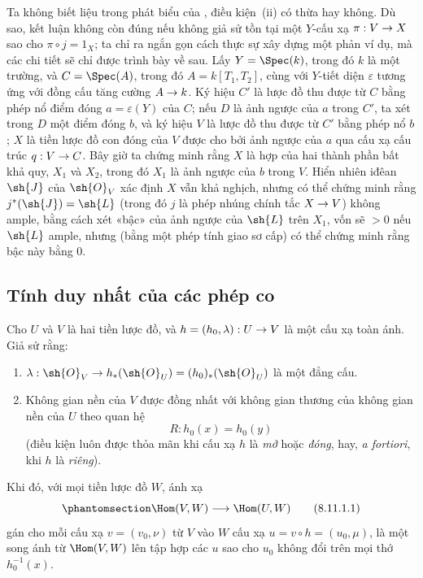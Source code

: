\documentclass[oneside,10pt]{amsart}
\makeatletter
\newcommand{\ega@arrow}[2]{\mathchoice{#1}{#2}{#2}{#2}}
\renewcommand{\to}{\ega@arrow{\longrightarrow}{\rightarrow}}
\newcommand{\oldpage}[2][]{\marginnote{\normalfont\footnotesize\textbf{#1}~|~#2}\ignorespaces}
\let\EGAOriginalLabel\label
\renewcommand{\label}[1]{\phantomsection\EGAOriginalLabel{#1}}
\makeatother
\begin{document}
\begin{remark}[8.10.7]
\label{II.8.10.7}
Ta không biết liệu trong phát biểu của , điều kiện~(ii) có thừa hay không.
Dù sao, kết luận không còn đúng nếu không giả sử tồn tại một $Y$-cấu xạ $\pi:V\to X$ sao cho $\pi\circ j=1_X$;
ta chỉ ra ngắn gọn cách thực sự xây dựng một phản ví dụ, mà các chi tiết sẽ chỉ được trình bày về sau.
Lấy $Y=\Spec(k)$, trong đó $k$ là một trường, và $C=\Spec(A)$, trong đó $A=k[T_1,T_2]$, cùng với $Y$-tiết diện $\varepsilon$ tương ứng với đồng cấu tăng cường $A\to k$.
Ký hiệu $C'$ là lược đồ thu được từ $C$ bằng phép nổ điểm đóng $a=\varepsilon(Y)$ của $C$;
nếu $D$ là ảnh ngược của $a$ trong $C'$, ta xét trong $D$ một điểm đóng $b$,
\oldpage[II]{189}
và ký hiệu $V$ là lược đồ thu được từ $C'$ bằng phép nổ $b$;
$X$ là tiền lược đồ con đóng của $V$ được cho bởi ảnh ngược của $a$ qua cấu xạ cấu trúc $q:V\to C$.
Bây giờ ta chứng minh rằng $X$ là hợp của hai thành phần bất khả quy, $X_1$ và $X_2$, trong đó $X_1$ là ảnh ngược của $b$ trong $V$.
Hiển nhiên iđêan $\sh{J}$ của $\sh{O}_V$ xác định $X$ vẫn khả nghịch, nhưng có thể chứng minh rằng $j^*(\sh{J})=\sh{L}$ (trong đó $j$ là phép nhúng chính tắc $X\to V$) không ample, bằng cách xét «bậc» của ảnh ngược của $\sh{L}$ trên $X_1$, vốn sẽ $>0$ nếu $\sh{L}$ ample, nhưng (bằng một phép tính giao sơ cấp) có thể chứng minh rằng bậc này bằng $0$.
\end{remark}

\subsection{Tính duy nhất của các phép co}
\label{subsection:II.8.11}

\begin{lemma}[8.11.1]
\label{II.8.11.1}
Cho $U$ và $V$ là hai tiền lược đồ, và $h=(h_0,\lambda):U\to V$ là một cấu xạ toàn ánh.
Giả sử rằng:
\begin{enumerate}
  \item[$1^\circ$] $\lambda:\sh{O}_V\to h_*(\sh{O}_U)=(h_0)_*(\sh{O}_U)$ là một đẳng cấu.
  \item[$2^\circ$] Không gian nền của $V$ được đồng nhất với không gian thương của không gian nền của $U$ theo quan hệ
  \[
      R:h_0(x)=h_0(y)
  \]
  (điều kiện luôn được thỏa mãn khi cấu xạ $h$ là \emph{mở} hoặc \emph{đóng}, hay, \emph{a fortiori}, khi $h$ là \emph{riêng}).
\end{enumerate}
Khi đó, với mọi tiền lược đồ $W$, ánh xạ
\[
\label{II.8.11.1.1}
    \Hom(V,W)\longrightarrow\Hom(U,W)
\tag{8.11.1.1}
\]
gán cho mỗi cấu xạ $v=(v_0,\nu)$ từ $V$ vào $W$ cấu xạ $u=v\circ h=(u_0,\mu)$, là một song ánh từ $\Hom(V,W)$ lên tập hợp các $u$ sao cho $u_0$ không đổi trên mọi thớ $h_0^{-1}(x)$.
\end{lemma}
\end{document}
